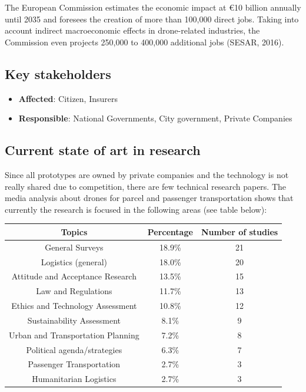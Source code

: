 \documentclass[
]{book}
\providecommand{\tightlist}{%
  \setlength{\itemsep}{0pt}\setlength{\parskip}{0pt}}
\begin{document}
The European Commission estimates the economic impact at €10 billion annually until 2035 and foresees the creation of more than 100,000 direct jobs. Taking into account indirect macroeconomic effects in drone-related industries, the Commission even projects 250,000 to 400,000 additional jobs (SESAR, 2016).

\hypertarget{key-stakeholders-39}{%
\subsection*{Key stakeholders}\label{key-stakeholders-39}}

\begin{itemize}
\tightlist
\item
  \textbf{Affected}: Citizen, Insurers
\item
  \textbf{Responsible}: National Governments, City government, Private Companies
\end{itemize}

\hypertarget{current-state-of-art-in-research-39}{%
\subsection*{Current state of art in research}\label{current-state-of-art-in-research-39}}

Since all prototypes are owned by private companies and the technology is not really shared due to competition, there are few technical research papers.
The media analysis about drones for parcel and passenger transportation shows that currently the research is focused in the following areas (see table below):

\begin{longtable}[]{@{}ccc@{}}
\toprule
Topics & Percentage & Number of studies\tabularnewline
\midrule
\endhead
General Surveys & 18.9\% & 21\tabularnewline
Logistics (general) & 18.0\% & 20\tabularnewline
Attitude and Acceptance Research & 13.5\% & 15\tabularnewline
Law and Regulations & 11.7\% & 13\tabularnewline
Ethics and Technology Assessment & 10.8\% & 12\tabularnewline
Sustainability Assessment & 8.1\% & 9\tabularnewline
Urban and Transportation Planning & 7.2\% & 8\tabularnewline
Political agenda/strategies & 6.3\% & 7\tabularnewline
Passenger Transportation & 2.7\% & 3\tabularnewline
Humanitarian Logistics & 2.7\% & 3\tabularnewline
\bottomrule
\end{longtable}
\end{document}
